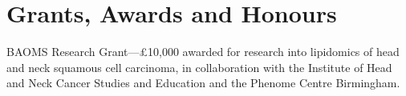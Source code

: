 \section*{Grants, Awards and Honours}

 BAOMS Research Grant---\pounds10,000 awarded for research into lipidomics of head and neck squamous cell carcinoma, in collaboration with the Institute of Head and Neck Cancer Studies and Education and the Phenome Centre Birmingham.
